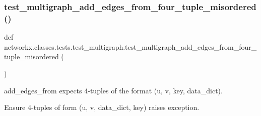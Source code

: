 \subsubsection{\texorpdfstring{test\+\_\+multigraph\+\_\+add\+\_\+edges\+\_\+from\+\_\+four\+\_\+tuple\+\_\+misordered()}{test\_multigraph\_add\_edges\_from\_four\_tuple\_misordered()}}
{\footnotesize\ttfamily def networkx.\+classes.\+tests.\+test\+\_\+multigraph.\+test\+\_\+multigraph\+\_\+add\+\_\+edges\+\_\+from\+\_\+four\+\_\+tuple\+\_\+misordered (\begin{DoxyParamCaption}{ }\end{DoxyParamCaption})}

\begin{DoxyVerb}add_edges_from expects 4-tuples of the format (u, v, key, data_dict).

Ensure 4-tuples of form (u, v, data_dict, key) raises exception.
\end{DoxyVerb}
 